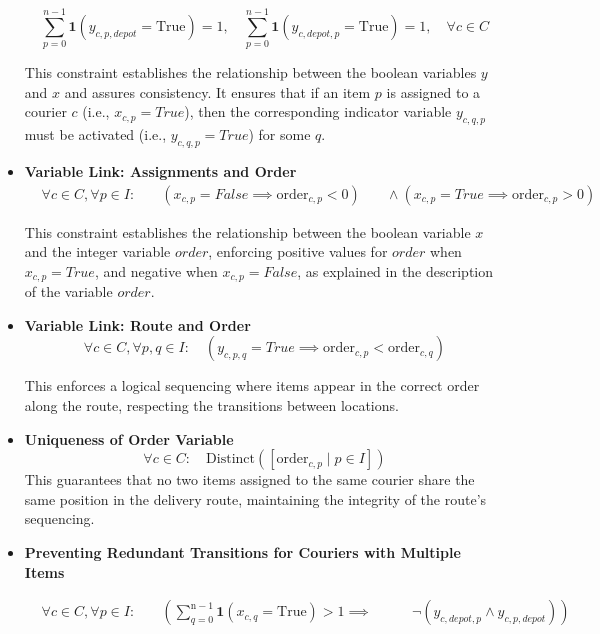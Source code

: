 \begin{itemize}
\[
\sum_{p=0}^{n-1} \mathbf{1}(y_{c,p,depot} = \text{True}) = 1, \quad 
\sum_{p=0}^{n-1} \mathbf{1}(y_{c,depot,p} = \text{True}) = 1, \quad \forall c \in C
\]


This constraint establishes the relationship between the boolean variables \(y\) and \(x\) and assures consistency. It ensures that if an item \(p\) is assigned to a courier \(c\) (i.e., \(x_{c,p} = True\)), then the corresponding indicator variable \(y_{c,q,p}\) must be activated (i.e., \(y_{c,q,p} = True\)) for some \(q\). 

\item \textbf{Variable Link: Assignments and Order}
\[
\begin{aligned}
&\forall c \in C, \forall p \in I: &\quad \left( x_{c,p} = False \implies \text{order}_{c,p} < 0 \right) &\quad \land \left( x_{c,p} = True \implies \text{order}_{c,p} > 0 \right)
\end{aligned}
\]


This constraint establishes the relationship between the boolean variable \(x\) and the integer variable $order$, enforcing positive values for $order$ when $x_{c,p}=True$, and negative when $x_{c,p}=False$, as explained in the description of the variable $order$.
\item \textbf{Variable Link: Route and Order}
\[
\forall c \in C, \forall p, q \in I: \quad
\left( y_{c,p,q} = True \implies \text{order}_{c,p} < \text{order}_{c,q} \right)
\]

This enforces a logical sequencing where items appear in the correct order along the route, respecting the transitions between locations.

\item \textbf{Uniqueness of Order Variable}
\[
\forall c \in C: \quad
\text{Distinct}\left( \left[ \text{order}_{c,p} \mid p \in I \right] \right)
\]
This guarantees that no two items assigned to the same courier share the same position in the delivery route, maintaining the integrity of the route's sequencing.

\item \textbf{Preventing Redundant Transitions for Couriers with Multiple Items}

\[
\begin{aligned}
&\forall c \in C, \forall p \in I: 
&\quad \left( \sum_{q=0}^{\text{n} - 1}
\mathbf{1}(x_{c,q} = \text{True}) > 1
 \implies \right. 
&\quad \quad \left. \neg \left( y_{c,depot,p} \land y_{c,p,depot} \right) \right)
\end{aligned}
\]


\end{itemize}
